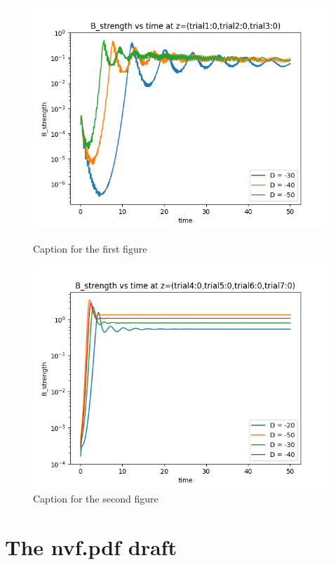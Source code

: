 \documentclass[a4paper,10pt]{article}
\newcommand{\1}{_\mathrm{1}}					   	%
\newcommand{\2}{_\mathrm{2}}					   	%
\begin{document}
\begin{figure}[h]
    \centering
    \begin{minipage}{0.49\linewidth}
        \centering
        \includegraphics[width=\linewidth]{B_strength_vs_time_f_pos.png}
        \caption{Caption for the first figure}
        \label{fig:fig1}
    \end{minipage}
    \hfill
    \begin{minipage}{0.5\linewidth}
        \centering
        \includegraphics[width=\linewidth]{B_strength_vs_time.png}
        \caption{Caption for the second figure}
        \label{fig:fig2}
    \end{minipage}
\end{figure}
\section{The nvf.pdf draft}
\end{document}
